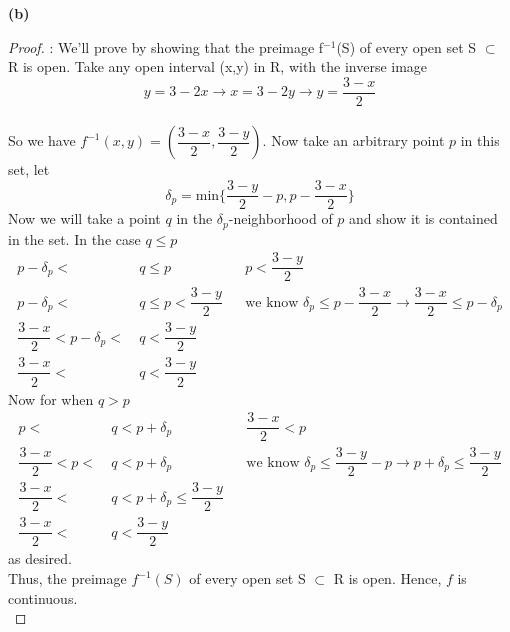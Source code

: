 \documentclass[12pt]{article}
\begin{document}
    \noindent\textbf{(b)}
    \begin{proof} : We'll prove by showing that the preimage f$^{-1}$(S)
    of every open set S $\subset$ R is open.
    Take any open interval (x,y) in R, with the inverse image
    \[y=3-2x \rightarrow x=3-2y \rightarrow y=\frac{3-x}{2}\] \\
    So we have $f^{-1}(x,y) = (\dfrac{3-x}{2},\dfrac{3-y}{2})$. Now take an arbitrary point $p$ in this set, let \[\delta_p = \text{min}\{\dfrac{3-y}{2} - p,p - \dfrac{3-x}{2}\}\]
    Now we will take a point $q$ in the $\delta_p$-neighborhood of $p$ and show it is contained in the set.
    In the case $q \leq p$
    \begin{align*}
        p-\delta_p <\ &q \leq p && p < \dfrac{3-y}{2} \\
        p-\delta_p <\ &q \leq p < \dfrac{3-y}{2} && \text{we know $\delta_p \leq p - \dfrac{3-x}{2} \rightarrow \dfrac{3-x}{2} \leq p-\delta_p$} \\
        \dfrac{3-x}{2}< p-\delta_p <\ &q < \dfrac{3-y}{2} \\
        \dfrac{3-x}{2} <\ &q < \dfrac{3-y}{2}
    \end{align*}
    \newpage
    Now for when $q > p$
    \begin{align*}
        p <\ &q < p + \delta_p && \dfrac{3-x}{2} < p \\
        \dfrac{3-x}{2} < p <\ &q < p +\delta_p && \text{we know $\delta_p \leq \dfrac{3-y}{2}-p \rightarrow p+ \delta_p\leq \dfrac{3-y}{2}  $} \\
        \dfrac{3-x}{2} <\ &q < p +\delta_p \leq  \dfrac{3-y}{2} \\
        \dfrac{3-x}{2} <\ &q < \dfrac{3-y}{2}
    \end{align*}
    as desired. 
    \\ Thus, the preimage $f^{-1}(S)$
    of every open set S $\subset$ R is open. Hence, $f$ is continuous. \\
    \end{proof}
\end{document}

